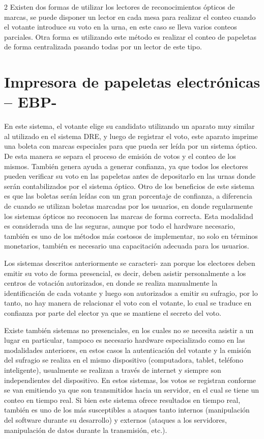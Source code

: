 \documentclass[12pt,spanish,Letterpaper,openany]{book}
\begin{document}
\begin {multicols}{2}
Existen dos formas de utilizar los lectores de reconocimientos ópticos de marcas, se puede disponer un lector en cada mesa para realizar el conteo cuando el votante introduce su voto en la urna, en este caso se lleva varios conteos parciales. Otra forma es utilizando este método es realizar el conteo de papeletas de forma centralizada pasando todas por un lector de este tipo.

\hypertarget{impresora-de-papeletas-electronicas-ebp-}{%
\section{Impresora de papeletas electrónicas -- EBP-}\label{impresora-de-papeletas-electronicas-ebp-}}

En este sistema, el votante elige su candidato utilizando un aparato muy similar al utilizado en el sistema DRE, y luego de registrar el voto, este aparato imprime una boleta con marcas especiales para que pueda ser leída por un sistema óptico. De esta manera se separa el proceso de emisión de votos y el conteo de los mismos. También genera ayuda a generar confianza, ya que todos los electores pueden verificar su voto en las papeletas antes de depositarlo en las urnas donde serán contabilizados por el sistema óptico. Otro de los beneficios de este sistema es que las boletas serán leídas con un gran porcentaje de confianza, a diferencia de cuando se utilizan boletas marcadas por los usuarios, en donde regularmente los sistemas ópticos no reconocen las marcas de forma correcta. Esta modalidad es considerada una de las seguras, aunque por todo el hardware necesario, también es uno de los métodos más costosos de implementar, no solo en términos monetarios, también es necesario una capacitación adecuada para los usuarios.

Los sistemas descritos anteriormente se caracteri-
zan porque los electores deben emitir su voto de forma presencial, es decir, deben asistir personalmente a los centros de votación autorizados, en donde se realiza manualmente la identificación de cada votante y luego son autorizados a emitir su sufragio, por lo tanto, no hay manera de relacionar el voto con el votante, lo cual se traduce en confianza por parte del elector ya que se mantiene el secreto del voto.

Existe también sistemas no presenciales, en los cuales no se necesita asistir a un lugar en particular, tampoco es necesario hardware especializado como en las modalidades anteriores, en estos casos la autenticación del votante y la emisión del sufragio se realiza en el mismo dispositivo (computadora, tablet, teléfono inteligente), usualmente se realizan a través de internet y siempre son independientes del dispositivo. En estos sistemas, los votos se registran conforme se van emitiendo ya que son transmitidos hacia un servidor, en el cual se tiene un conteo en tiempo real. Si bien este sistema ofrece resultados en tiempo real, también es uno de los más susceptibles a ataques tanto internos (manipulación del software durante su desarrollo) y externos (ataques a los servidores, manipulación de datos durante la transmisión, etc.).


\end{multicols}
\end{document}
